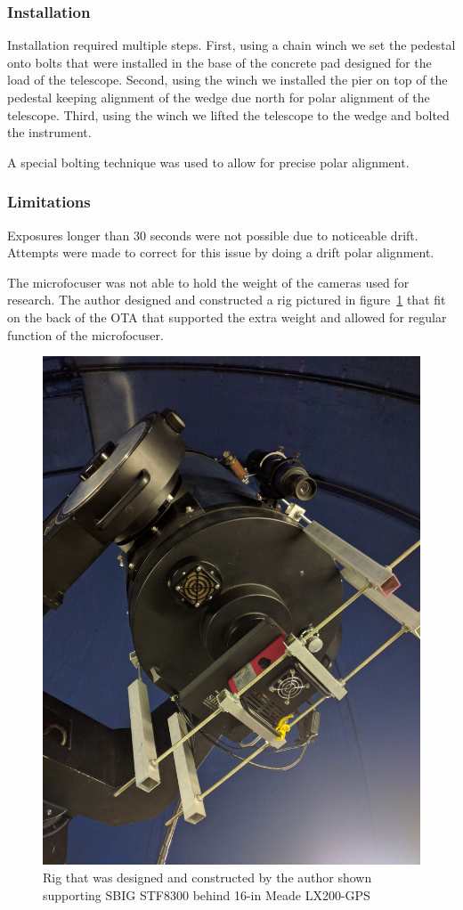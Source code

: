 \subsubsection{Installation}
Installation required multiple steps.
First, using a chain winch we set the pedestal onto bolts that were installed in the base of the concrete pad designed for the load of the telescope. 
Second, using the winch we installed the pier on top of the pedestal keeping alignment of the wedge due north for polar alignment of the telescope.
Third, using the winch we lifted the telescope to the wedge and bolted the instrument.

A special bolting technique was used to allow for precise polar alignment.

\subsubsection{Limitations}
Exposures longer than 30 seconds were not possible due to noticeable drift.
Attempts were made to correct for this issue by doing a drift polar alignment.

The microfocuser was not able to hold the weight of the cameras used for research.
The author designed and constructed a rig pictured in figure~\ref{fig:rig} that fit on the back of the OTA that supported the extra weight and allowed
for regular function of the microfocuser.
\begin{figure}[h]
    \centering
    \includegraphics[width=0.5\columnwidth]{figures/rig.jpg}
    \caption{Rig that was designed and constructed by the author shown supporting SBIG STF8300 behind 16-in Meade LX200-GPS}
\label{fig:rig}
\end{figure}

